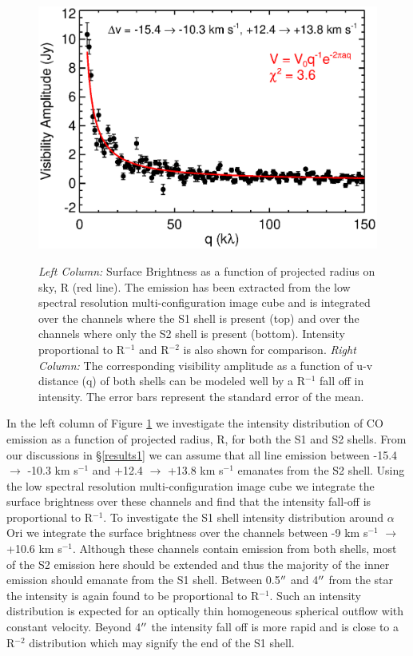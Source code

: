 \documentclass[iop]{emulateapj}
\begin{document}
\begin{figure}[hbt!]
{          \includegraphics[scale=0.50]{s2_visibilities.eps}
          }
\\
\caption{\textit{Left Column:} Surface Brightness as a function of projected radius on sky, R (red line). The emission has been extracted from the low spectral resolution multi-configuration image cube and is integrated over the channels where the S1 shell is present (top) and over the channels where only the S2 shell is present (bottom). Intensity proportional to R${}^{-1}$ and R${}^{-2}$ is also shown for comparison. \textit{Right Column:} The corresponding visibility amplitude as a function of u-v distance (q) of both shells can be modeled well by a R${}^{-1}$ fall off in intensity. The error bars represent the standard error of the mean.}
\label{fig:fig6}
\end{figure}

In the left column of Figure \ref{fig:fig6} we investigate the intensity distribution of CO emission as a function of projected radius, R, for both the S1 and S2 shells. From our discussions in \S \ref{results1} we can assume that all line emission between -15.4 $\rightarrow$ -10.3 km s${}^{-1}$ and +12.4 $\rightarrow$ +13.8 km s${}^{-1}$ emanates from the S2 shell. Using the low spectral resolution multi-configuration image cube we integrate the surface brightness over these channels and find that the intensity fall-off is proportional to R${}^{-1}$. To investigate the S1 shell intensity distribution around $\alpha$ Ori we integrate the surface brightness over the channels between -9 km s${}^{-1}$ $\rightarrow$ +10.6 km s${}^{-1}$. Although these channels contain emission from both shells, most of the S2 emission here should be extended and thus the majority of the inner emission should emanate from the S1 shell.  Between 0.5$\mbox{$^{\prime\prime}$}$ and 4$\mbox{$^{\prime\prime}$}$ from the star the intensity is again found to be proportional to R${}^{-1}$. Such an intensity distribution is expected for an optically thin homogeneous spherical outflow with constant velocity. Beyond 4$\mbox{$^{\prime\prime}$}$ the intensity fall off is more rapid and is close to a R${}^{-2}$ distribution which may signify the end of the S1 shell. 
\end{document}
